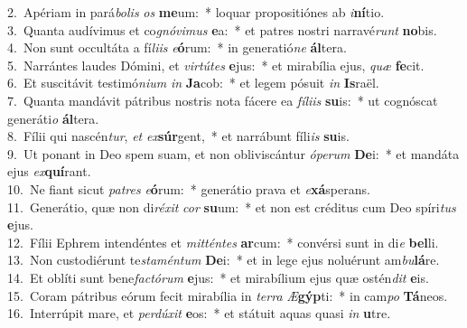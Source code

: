 {2.~}Apériam in pará\textit{bo}\textit{lis} \textit{os} \textbf{me}um:~* loquar propositiónes ab \textit{i}\textbf{ní}tio.\\
{3.~}Quanta audívimus et co\textit{gnó}\textit{vi}\textit{mus} \textbf{e}a:~* et patres nostri narravé\textit{runt} \textbf{no}bis.\\
{4.~}Non sunt occultáta a fí\textit{li}\textit{is} \textit{e}\textbf{ó}rum:~* in generatió\textit{ne} \textbf{ál}tera.\\
{5.~}Narrántes laudes Dómini, et \textit{vir}\textit{tú}\textit{tes} \textbf{e}jus:~* et mirabília ejus, \textit{quæ} \textbf{fe}cit.\\
{6.~}Et suscitávit testimó\textit{ni}\textit{um} \textit{in} \textbf{Ja}cob:~* et legem pósuit \textit{in} \textbf{Is}raël.\\
{7.~}Quanta mandávit pátribus nostris nota fácere ea \textit{fí}\textit{li}\textit{is} \textbf{su}is:~* ut cognóscat generáti\textit{o} \textbf{ál}tera.\\
{8.~}Fílii qui nascén\textit{tur}, \textit{et} \textit{ex}\textbf{súr}gent,~* et narrábunt fíli\textit{is} \textbf{su}is.\\
{9.~}Ut ponant in Deo spem suam, et non obliviscántur \textit{ó}\textit{pe}\textit{rum} \textbf{De}i:~* et mandáta ejus \textit{ex}\textbf{quí}rant.\\
{10.~}Ne fiant sicut \textit{pa}\textit{tres} \textit{e}\textbf{ó}rum:~* generátio prava et \textit{e}\textbf{xá}sperans.\\
{11.~}Generátio, quæ non di\textit{ré}\textit{xit} \textit{cor} \textbf{su}um:~* et non est créditus cum Deo spíri\textit{tus} \textbf{e}jus.\\
{12.~}Fílii Ephrem intendéntes et \textit{mit}\textit{tén}\textit{tes} \textbf{ar}cum:~* convérsi sunt in di\textit{e} \textbf{bel}li.\\
{13.~}Non custodiérunt te\textit{sta}\textit{mén}\textit{tum} \textbf{De}i:~* et in lege ejus noluérunt am\textit{bu}\textbf{lá}re.\\
{14.~}Et oblíti sunt bene\textit{fa}\textit{ctó}\textit{rum} \textbf{e}jus:~* et mirabílium ejus quæ ostén\textit{dit} \textbf{e}is.\\
{15.~}Coram pátribus eórum fecit mirabília in \textit{ter}\textit{ra} \textit{Æ}\textbf{gýp}ti:~* in cam\textit{po} \textbf{Tá}neos.\\
{16.~}Interrúpit mare, et \textit{per}\textit{dú}\textit{xit} \textbf{e}os:~* et státuit aquas quasi \textit{in} \textbf{u}tre.\\
